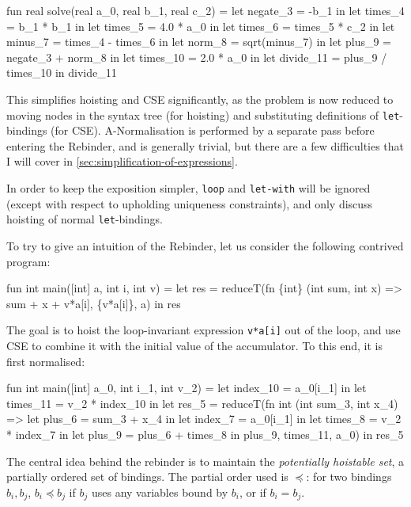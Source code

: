 \begin{colorcode}
fun real solve(real a_0, real b_1, real c_2) =
  let negate_3  = -b_1 in
  let times_4   = b_1 * b_1 in
  let times_5   = 4.0 * a_0 in
  let times_6   = times_5 * c_2 in
  let minus_7   = times_4 - times_6 in
  let norm_8    = sqrt(minus_7) in
  let plus_9    = negate_3 + norm_8 in
  let times_10  = 2.0 * a_0 in
  let divide_11 = plus_9 / times_10 in
  divide_11
\end{colorcode}

This simplifies hoisting and CSE significantly, as the problem is now
reduced to moving nodes in the syntax tree (for hoisting) and
substituting definitions of \texttt{let}-bindings (for CSE).
A-Normalisation is performed by a separate pass before entering the
Rebinder, and is generally trivial, but there are a few difficulties
that I will cover in \cref{sec:simplification-of-expressions}.

In order to keep the exposition simpler, \texttt{loop} and
\texttt{let-with} will be ignored (except with respect to upholding
uniqueness constraints), and only discuss hoisting of normal
\texttt{let}-bindings.

To try to give an intuition of the Rebinder, let us consider the
following contrived program:

\begin{colorcode}
fun int main([int] a, int i, int v) =
  let {res} =
    reduceT(fn \{int\} (int sum, int x) =>
              {sum + x + v*a[i]},
            \{v*a[i]\}, a) in
  res
\end{colorcode}

The goal is to hoist the loop-invariant expression \texttt{v*a[i]} out
of the loop, and use CSE to combine it with the initial value of the
accumulator.  To this end, it is first normalised:

\begin{colorcode}
fun int main([int] a_0, int i_1, int v_2) =
  let index_10 = a_0[i_1] in
  let times_11 = v_2 * index_10 in
  let {res_5} =
    reduceT(fn {int} (int sum_3, int x_4) =>
              let plus_6 = sum_3 + x_4 in
              let index_7 = a_0[i_1] in
              let times_8 = v_2 * index_7 in
              let plus_9 = plus_6 + times_8 in
              {plus_9},
            {times_11}, a_0) in
  res_5
\end{colorcode}

The central idea behind the rebinder is to maintain the
\textit{potentially hoistable set}, a partially ordered set of
bindings.  The partial order used is $\preceq$: for two bindings
$b_{i}, b_{j}$, $b_{i} \preceq b_{j}$ if $b_{j}$ uses any variables
bound by $b_{i}$, or if $b_{i} = b_{j}$.


